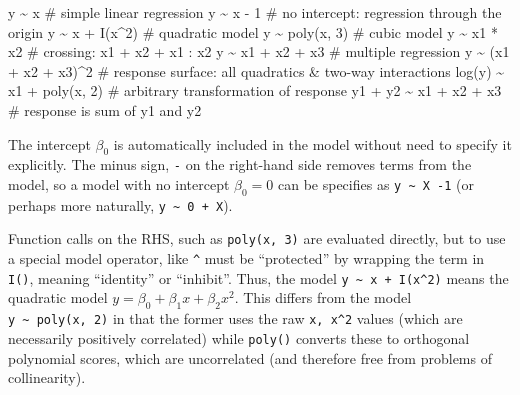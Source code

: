 \documentclass[
  letterpaper,
  10pt,
  krantz2]{krantz}
\makeatletter
\newenvironment{Shaded}{\begin{snugshade}}{\end{snugshade}}
\newcommand{\CommentTok}[1]{\textcolor[rgb]{0.37,0.37,0.37}{#1}}
\newcommand{\DecValTok}[1]{\textcolor[rgb]{0.68,0.00,0.00}{#1}}
\newcommand{\FunctionTok}[1]{\textcolor[rgb]{0.28,0.35,0.67}{#1}}
\newcommand{\NormalTok}[1]{\textcolor[rgb]{0.00,0.23,0.31}{#1}}
\newcommand{\SpecialCharTok}[1]{\textcolor[rgb]{0.37,0.37,0.37}{#1}}
\newenvironment{kframe}{%
  \medskip{}
  \setlength{\fboxsep}{.8em}
  \def\at@end@of@kframe{}%
  \ifinner\ifhmode%
  \def\at@end@of@kframe{\end{minipage}}%
  \begin{minipage}{\columnwidth}%
  \fi\fi%
  \def\FrameCommand##1{\hskip\@totalleftmargin \hskip-\fboxsep
  \colorbox{shadecolor}{##1}\hskip-\fboxsep
      \hskip-\linewidth \hskip-\@totalleftmargin \hskip\columnwidth}%
  \MakeFramed {\advance\hsize-\width
    \@totalleftmargin\z@ \linewidth\hsize
    \@setminipage}}%
{\par\unskip\endMakeFramed%
  \at@end@of@kframe}
\renewenvironment{Shaded}{\begin{kframe}}{\end{kframe}}
\makeatother
\begin{document}
\begin{Shaded}
\begin{Highlighting}[]
\NormalTok{y }\SpecialCharTok{\textasciitilde{}}\NormalTok{ x                      }\CommentTok{\# simple linear regression}
\NormalTok{y }\SpecialCharTok{\textasciitilde{}}\NormalTok{ x }\SpecialCharTok{{-}} \DecValTok{1}                  \CommentTok{\# no intercept: regression through the origin }
\NormalTok{y }\SpecialCharTok{\textasciitilde{}}\NormalTok{ x }\SpecialCharTok{+} \FunctionTok{I}\NormalTok{(x}\SpecialCharTok{\^{}}\DecValTok{2}\NormalTok{)             }\CommentTok{\# quadratic model}
\NormalTok{y }\SpecialCharTok{\textasciitilde{}} \FunctionTok{poly}\NormalTok{(x, }\DecValTok{3}\NormalTok{)             }\CommentTok{\# cubic model}
\NormalTok{y }\SpecialCharTok{\textasciitilde{}}\NormalTok{ x1 }\SpecialCharTok{*}\NormalTok{ x2                }\CommentTok{\# crossing: x1 + x2  +  x1 : x2}
\NormalTok{y }\SpecialCharTok{\textasciitilde{}}\NormalTok{ x1 }\SpecialCharTok{+}\NormalTok{ x2 }\SpecialCharTok{+}\NormalTok{ x3           }\CommentTok{\# multiple regression}
\NormalTok{y }\SpecialCharTok{\textasciitilde{}}\NormalTok{ (x1 }\SpecialCharTok{+}\NormalTok{ x2 }\SpecialCharTok{+}\NormalTok{ x3)}\SpecialCharTok{\^{}}\DecValTok{2}       \CommentTok{\# response surface: all quadratics \& two{-}way interactions}
\FunctionTok{log}\NormalTok{(y) }\SpecialCharTok{\textasciitilde{}}\NormalTok{ x1 }\SpecialCharTok{+} \FunctionTok{poly}\NormalTok{(x, }\DecValTok{2}\NormalTok{)   }\CommentTok{\# arbitrary transformation of response}
\NormalTok{y1 }\SpecialCharTok{+}\NormalTok{ y2 }\SpecialCharTok{\textasciitilde{}}\NormalTok{ x1 }\SpecialCharTok{+}\NormalTok{ x2 }\SpecialCharTok{+}\NormalTok{ x3     }\CommentTok{\# response is sum of y1 and y2}
\end{Highlighting}
\end{Shaded}

The intercept \(\beta_0\) is automatically included in the model without
need to specify it explicitly. The minus sign, \texttt{-} on the
right-hand side removes terms from the model, so a model with no
intercept \(\beta_0 = 0\) can be specifies as
\texttt{y\ \textasciitilde{}\ X\ -1} (or perhaps more naturally,
\texttt{y\ \textasciitilde{}\ 0\ +\ X}).

Function calls on the RHS, such as \texttt{poly(x,\ 3)} are evaluated
directly, but to use a special model operator, like \texttt{\^{}} must
be ``protected'' by wrapping the term in \texttt{I()}, meaning
``identity'' or ``inhibit''. Thus, the model
\texttt{y\ \textasciitilde{}\ x\ +\ I(x\^{}2)} means the quadratic model
\(y = \beta_0 + \beta_1 x + \beta_2 x^2\). This differs from the model
\texttt{y\ \textasciitilde{}\ poly(x,\ 2)} in that the former uses the
raw \texttt{x,\ x\^{}2} values (which are necessarily positively
correlated) while \texttt{poly()} converts these to orthogonal
polynomial scores, which are uncorrelated (and therefore free from
problems of collinearity).
\end{document}
